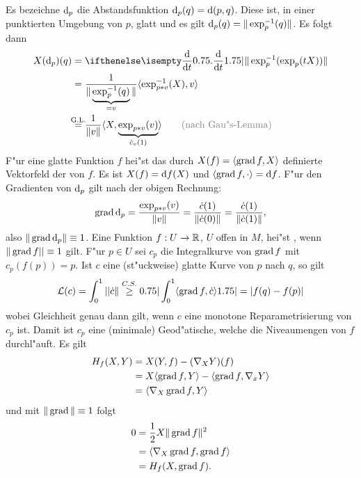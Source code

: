 Es bezeichne $\mathrm{d}_p$ die Abstandsfunktion $\mathrm{d}_p(q) = \mathrm{d}(p, q)$.
Diese ist, in einer punktierten Umgebung von $p$, glatt und es gilt $\mathrm{d}_p(q) = \| \exp_p^{-1}(q) \|$. Es folgt dann
\begin{align*}
	X(\dop_p)(q) &= \difffrac{}{t} \| \exp_p^{-1}(\exp_p(tX))\|\\
	&= \frac{1}{\| \underbrace{\exp_p^{-1}(q)}_{=v}\|} \langle \exp_{p*v}^{-1}(X), v \rangle\\
	&\overset{\mathclap{\text{G.L.}}}{=} \frac{1}{\|v\|} \langle X, \underbrace{\exp_{p*v}(v)}_{\dot c_v(1)} \rangle \qquad\textcolor{gray}{\text{(nach Gau"s-Lemma)}}
\end{align*}
F"ur eine glatte Funktion $f$ hei"st das durch $X(f) = \langle \operatorname{grad} f, X \rangle$ definierte Vektorfeld der  von $f$.
Es ist $X(f) = \mathrm{d} f(X)$ und $\langle \operatorname{grad} f, \cdot \rangle = \mathrm{d} f$. F"ur den Gradienten von $\mathrm{d}_p$ gilt nach der obigen Rechnung:
\begin{align*}
	\operatorname{grad} \mathrm{d}_p = \frac{\exp_{p*v}(v)}{\|v\|} = \frac{\dot c(1)}{\|\dot c(0)\|} = \frac{\dot c(1)}{\|\dot c(1)\|},
\end{align*}
also $\|\operatorname{grad} \mathrm{d}_p\| \equiv 1$. Eine Funktion $f: U \to \operatorname{\mathbb{R}}$, $U$ offen in $M$, hei"st , wenn $\|\operatorname{grad} f|| \equiv 1$ gilt.
F"ur $p \in U$ sei $c_p$ die Integralkurve von $\operatorname{grad} f$ mit $c_p(f(p)) = p$. Ist $c$ eine (st"uckweise) glatte Kurve von $p$ nach $q$, so gilt
\begin{align*}
	\operatorname{\mathcal{L}}(c) = \int_0^1 ||\dot c\| \overset{C.S.}{\ge} 0.75| \int_0^1 \langle \operatorname{grad} f, \dot c \rangle 1.75| = | f(q) - f(p) |
\end{align*}
wobei Gleichheit genau dann gilt, wenn $c$ eine monotone Reparametrisierung von $c_p$ ist. Damit ist $c_p$ eine (minimale) Geod"atische, welche die Niveaumengen von $f$ durchl"auft.
Es gilt
\begin{align*}
	H_f(X, Y) &= X(Y, f) - (\nabla_X Y)(f)\\
	&= X \langle \operatorname{grad} f, Y \rangle - \langle \operatorname{grad} f, \nabla_x Y \rangle\\
	&= \langle \nabla_X \operatorname{grad} f, Y \rangle
\end{align*}
und mit $\|\operatorname{grad}\| \equiv 1$ folgt
\begin{align*}
	0 &= \frac{1}{2} X \|\operatorname{grad} f\|^2\\
	&= \langle \nabla_X \operatorname{grad} f, \operatorname{grad} f \rangle\\
	&= H_f(X, \operatorname{grad} f).
\end{align*}
